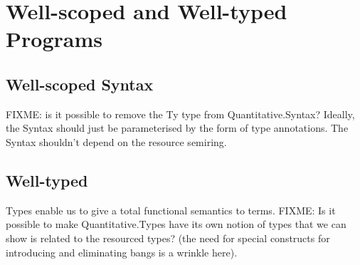 \documentclass[sigplan,review]{acmart}\settopmatter{printfolios=true,printccs=false,printacmref=false}
\begin{document}
\section{Well-scoped and Well-typed Programs}

\subsection{Well-scoped Syntax}

FIXME: is it possible to remove the Ty type from Quantitative.Syntax?
Ideally, the Syntax should just be parameterised by the form of type
annotations. The Syntax shouldn't depend on the resource semiring.

\subsection{Well-typed}

Types enable us to give a total functional semantics to terms. FIXME:
Is it possible to make Quantitative.Types have its own notion of types
that we can show is related to the resourced types? (the need for
special constructs for introducing and eliminating bangs is a wrinkle
here).
\end{document}
